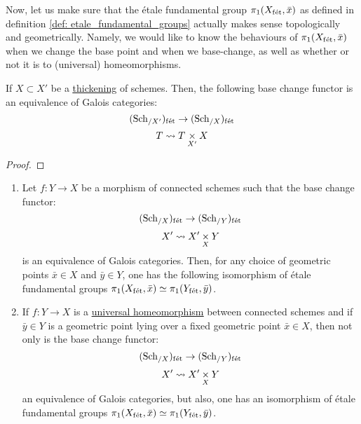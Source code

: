         Now, let us make sure that the \'etale fundamental group $\pi_1(X_{\mathrm{f\acute{e}t}}, \bar{x})$ as defined in definition \ref{def: etale_fundamental_groups} actually makes sense topologically and geometrically. Namely, we would like to know the behaviours of $\pi_1(X_{\mathrm{f\acute{e}t}}, \bar{x})$ when we change the base point and when we base-change, as well as whether or not it is  to (universal) homeomorphisms.
        \begin{lemma} \label{lemma: base_change_of_thickenings}
            If $X \subset X'$ be a \href{https://stacks.math.columbia.edu/tag/04EW}{\underline{thickening}} of schemes. Then, the following base change functor is an equivalence of Galois categories:
                $$(\mathrm{Sch}_{/X'})_{\mathrm{f\acute{e}t}} \to (\mathrm{Sch}_{/X})_{\mathrm{f\acute{e}t}}$$
                $$T \mapsto T \x_{X'} X$$
        \end{lemma}
            \begin{proof}
                
            \end{proof}
        \begin{proposition} \label{prop: the_etale_fundamental_group_as_a_topological_invariance}
            \noindent
            \begin{enumerate}
                \item Let $f: Y \to X$ be a morphism of connected schemes such that the base change functor:
                    $$(\mathrm{Sch}_{/X})_{\mathrm{f\acute{e}t}} \to (\mathrm{Sch}_{/Y})_{\mathrm{f\acute{e}t}}$$
                    $$X' \mapsto X' \x_X Y$$
                is an equivalence of Galois categories. Then, for any choice of geometric points $\bar{x} \in X$ and $\bar{y} \in Y$, one has the following isomorphism of \'etale fundamental groups $\pi_1(X_{\mathrm{f\acute{e}t}}, \bar{x}) \simeq \pi_1(Y_{\mathrm{f\acute{e}t}}, \bar{y})$.
                \item If $f: Y \to X$ is a \href{https://stacks.math.columbia.edu/tag/04DC}{\underline{universal homeomorphism}} between connected schemes and if $\bar{y} \in Y$ is a geometric point lying over a fixed geometric point $\bar{x} \in X$, then not only is the base change functor:
                    $$(\mathrm{Sch}_{/X})_{\mathrm{f\acute{e}t}} \to (\mathrm{Sch}_{/Y})_{\mathrm{f\acute{e}t}}$$
                    $$X' \mapsto X' \x_X Y$$
                an equivalence of Galois categories, but also, one has an isomorphism of \'etale fundamental groups $\pi_1(X_{\mathrm{f\acute{e}t}}, \bar{x}) \simeq \pi_1(Y_{\mathrm{f\acute{e}t}}, \bar{y})$. 
            \end{enumerate}
        \end{proposition}
